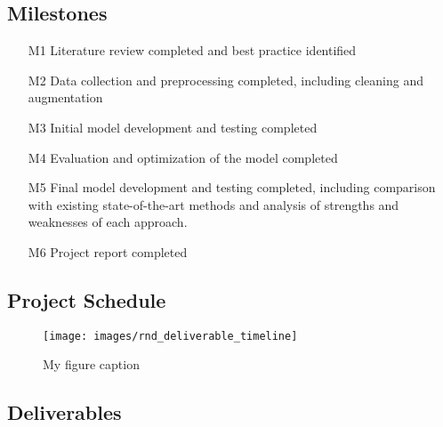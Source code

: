 \documentclass[rnd]{mas_proposal}
\begin{document}
\subsection{Milestones}
\begin{enumerate}
    \item[M1] Literature review completed and best practice identified
    \item[M2] Data collection and preprocessing completed, including cleaning and augmentation
    \item[M3] Initial model development and testing completed
    \item[M4] Evaluation and optimization of the model completed
    \item[M5] Final model development and testing completed, including comparison with existing state-of-the-art methods and analysis of strengths and weaknesses of each approach.
    \item[M6] Project report completed
\end{enumerate}

\subsection{Project Schedule}

\begin{figure}[h!]
    \texttt{[image: images/rnd\_deliverable\_timeline]}
    \caption{My figure caption}
    \label{fig:myfigure}
\end{figure}

\subsection{Deliverables}
\end{document}
